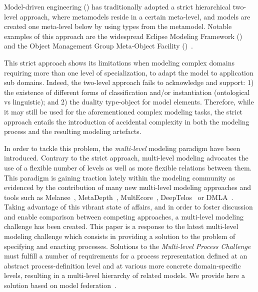 Model-driven engineering (\MDE) has traditionally adopted a strict hierarchical two-level approach, where metamodels reside in a certain meta-level, and models are created one meta-level below by using types from the metamodel. Notable examples of this approach are the widespread Eclipse Modeling Framework (\EMF)~\parencite{emf} and the Object Management Group Meta-Object Facility (\MOF)~\parencite{omg2013mof}.

This strict approach shows its limitations when modeling complex domains requiring more than one level of specialization, \eg to adapt the model to application sub domains. Indeed, the two-level approach fails to acknowledge and support: 1) the existence of different forms of classification and/or instantiation (\eg ontological vs linguistic); and 2) the duality type-object for model elements. Therefore, while it may still be used for the aforementioned complex modeling tasks, the strict approach entails the introduction of accidental complexity in both the modeling process and the resulting modeling artefacts. 

In order to tackle this problem, the \emph{multi-level} modeling paradigm have been introduced. Contrary to the strict approach, multi-level modeling advocates the use of a flexible number of levels as well as more flexible relations between them. This paradigm is gaining traction lately within the modeling community as evidenced by the contribution of many new multi-level modeling approaches and tools such as Melanee~\parencite{melanee}, MetaDepth~\parencite{metadepth}, MultEcore~\parencite{multecore2016}, DeepTelos~\parencite{deeptelos2016} or DMLA~\parencite{dmla2017}. Taking advantage of this vibrant state of affairs, and in order to foster discussion and enable comparison between competing approaches, a multi-level modeling challenge has been created. This paper is a response to the latest multi-level modeling challenge
which consists in providing a solution to the problem of specifying and enacting processes. Solutions to the \emph{Multi-level Process Challenge} must fulfill a number of requirements for a process representation defined at an abstract process-definition level and at various more concrete domain-specific levels, resulting in a multi-level hierarchy of related models. We provide here a solution based on model federation~\parencite{Golra2016-federation}.


